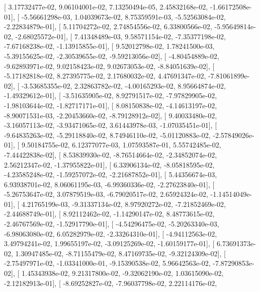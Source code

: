 \documentclass{article}
\begin{document}
       [  3.17732477e-02,   9.06104001e-02,   7.13250494e-05,
          2.45832168e-02,  -1.66172508e-01],
       [ -5.56661298e-03,   1.04039673e-02,   8.75359591e-03,
         -5.52563084e-02,  -2.22834879e-01],
       [  5.11704272e-02,   2.74854556e-02,   6.33800566e-02,
         -5.95649814e-02,  -2.68025572e-01],
       [  7.41348489e-03,   9.58571154e-02,  -7.35377198e-02,
         -7.67168238e-02,  -1.13915855e-01],
       [  9.52012798e-02,   1.78241500e-03,  -5.39155625e-02,
         -2.30539655e-02,  -9.59213056e-02],
       [ -4.80454889e-02,  -9.62893971e-02,   9.02158423e-02,
          9.02673053e-02,  -8.84051639e-02],
       [ -5.17182818e-02,   8.27395775e-02,   2.17680032e-02,
          4.47691347e-02,  -7.81061899e-02],
       [ -3.53685355e-02,   2.32863782e-02,  -4.00165293e-02,
          8.95664874e-02,  -1.49329612e-01],
       [ -3.51635905e-02,   8.92791517e-02,  -7.97829905e-02,
         -1.98103644e-02,  -1.82717171e-01],
       [  8.08150838e-02,  -4.14613197e-02,  -8.90071531e-03,
         -2.20453660e-02,  -8.79128912e-02],
       [  9.40033480e-02,  -3.16057113e-02,  -3.93471065e-02,
          3.61443978e-03,  -1.07035451e-01],
       [ -9.64835263e-02,  -5.29118840e-02,   8.74946110e-02,
         -5.01120883e-02,  -2.57849026e-01],
       [  9.50184755e-02,   6.12377077e-03,   1.07593587e-01,
          5.55742485e-02,  -7.44422838e-02],
       [  8.53839930e-02,  -8.76514664e-02,  -2.34852074e-02,
          2.56212347e-02,  -1.37955822e-01],
       [  6.33906134e-02,  -8.05818595e-02,  -4.23585248e-02,
         -1.59257072e-02,  -2.21687852e-01],
       [  5.44356674e-03,   6.93938701e-02,   8.06061195e-03,
         -6.99360336e-02,  -2.27623840e-01],
       [ -5.26753647e-02,   3.07879519e-03,  -6.79020517e-02,
          2.65924324e-02,  -1.14514049e-01],
       [  4.21765199e-03,  -9.31337134e-02,   8.97920272e-02,
         -7.21852469e-02,  -2.44688749e-01],
       [  8.92112462e-02,  -1.14290147e-02,   8.48773615e-02,
         -2.46767569e-02,  -1.52917790e-01],
       [ -4.54296475e-02,  -5.20263340e-03,  -6.98063080e-02,
          6.05282979e-02,  -2.33264310e-01],
       [ -4.94112563e-02,   3.49794241e-02,   1.99655197e-02,
         -3.09125269e-02,  -1.60159177e-01],
       [  6.73691373e-02,   1.30947485e-02,  -8.71155479e-02,
          8.47169735e-02,  -9.32124309e-02],
       [ -2.75497971e-02,  -1.03341000e-01,  -9.15390538e-02,
          5.96642563e-02,  -7.87290853e-02],
       [  1.45343938e-02,   9.21317800e-02,  -9.32062190e-02,
          1.03615090e-02,  -2.12182913e-01],
       [ -8.69252827e-02,  -7.96037798e-02,   2.22114176e-02,
\end{document}
